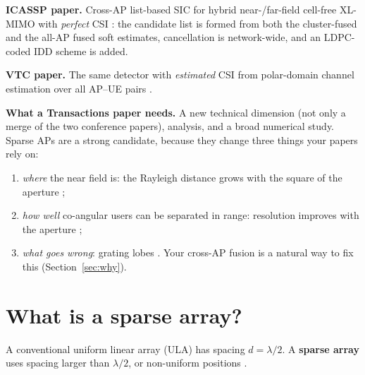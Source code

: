 \documentclass[11pt]{article}
\begin{document}
\textbf{ICASSP paper.} Cross-AP list-based SIC for hybrid near-/far-field cell-free XL-MIMO with \emph{perfect} CSI \cite{haider2026icassp}: the candidate list is formed from both the cluster-fused and the all-AP fused soft estimates, cancellation is network-wide, and an LDPC-coded IDD scheme is added.

\textbf{VTC paper.} The same detector with \emph{estimated} CSI from polar-domain channel estimation over all AP--UE pairs \cite{haider2026vtc,cui2022channel}.

\textbf{What a Transactions paper needs.} A new technical dimension (not only a merge of the two conference papers), analysis, and a broad numerical study. Sparse APs are a strong candidate, because they change three things your papers rely on:
\begin{enumerate}
  \item \emph{where} the near field is: the Rayleigh distance grows with the square of the aperture \cite{lu2024tutorial,bjornson2021primer};
  \item \emph{how well} co-angular users can be separated in range: resolution improves with the aperture \cite{chen2024nearfield,wang2024sparsemimo,zhou2025sparse};
  \item \emph{what goes wrong}: grating lobes \cite{zhou2025sparse,chen2025exploring,chen2024nearfield}. Your cross-AP fusion is a natural way to fix this (Section~\ref{sec:why}).
\end{enumerate}

\section{What is a sparse array?}
\label{sec:what}

A conventional uniform linear array (ULA) has spacing $d=\lambda/2$. A \textbf{sparse array} uses spacing larger than $\lambda/2$, or non-uniform positions \cite{zhou2025sparse,chen2024nearfield,li2024sparseisac}.
\end{document}
